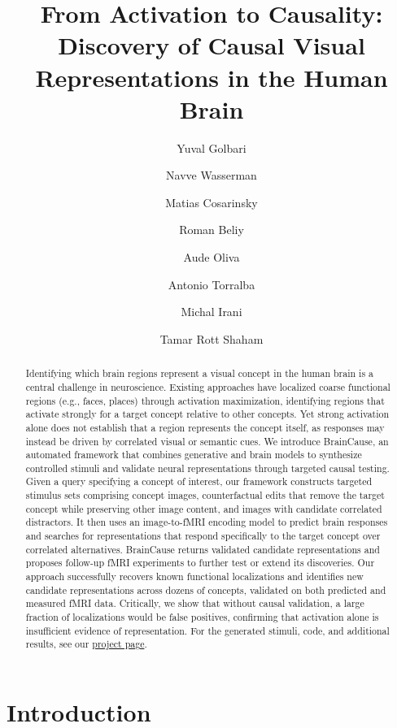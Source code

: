 \documentclass{llmxive}
\title{From Activation to Causality: Discovery of Causal Visual Representations in the Human Brain}
\author{Yuval Golbari \and Navve Wasserman \and Matias Cosarinsky \and Roman Beliy \and Aude Oliva \and Antonio Torralba \and Michal Irani \and Tamar Rott Shaham}
\begin{document}
\maketitle
\begin{abstract}
Identifying which brain regions represent a visual concept in the human brain is a central challenge in neuroscience. Existing approaches have localized coarse functional regions (e.g., faces, places) through activation maximization, identifying regions that activate strongly for a target concept relative to other concepts. Yet strong activation alone does not establish that a region represents the concept itself, as responses may instead be driven by correlated visual or semantic cues.
We introduce BrainCause, an automated framework that combines generative and brain models to synthesize controlled stimuli and validate neural representations through targeted causal testing. Given a query specifying a concept of interest, our framework constructs targeted stimulus sets comprising concept images, counterfactual edits that remove the target concept while preserving other image content, and images with candidate
correlated distractors. It then uses an image-to-fMRI encoding model to predict brain responses and searches for representations that respond specifically to the target concept over correlated alternatives. BrainCause returns validated candidate representations and proposes follow-up fMRI experiments to further test or extend its discoveries. Our approach successfully recovers known functional localizations and identifies new candidate representations across dozens of concepts, validated on both predicted and measured fMRI data. Critically, we show that without causal validation, a large fraction of localizations would be false positives, confirming that activation alone is insufficient evidence of representation.
For the generated stimuli, code, and additional results, see our \href{https://yuvalgol123.github.io/BrainCause/}{project page}.
\end{abstract}
\section{Introduction}
\end{document}
